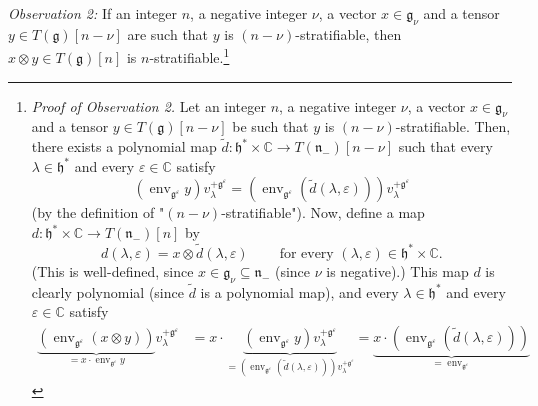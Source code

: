 \documentclass
[numbers=enddot,12pt,final,onecolumn,german,notitlepage]{scrartcl}%
\theoremstyle{definition}
\begin{document}
\textit{Observation 2:} If an integer $n$, a negative integer $\nu$, a vector
$x\in\mathfrak{g}_{\nu}$ and a tensor $y\in T\left(  \mathfrak{g}\right)
\left[  n-\nu\right]  $ are such that $y$ is $\left(  n-\nu\right)
$-stratifiable, then $x\otimes y\in T\left(  \mathfrak{g}\right)  \left[
n\right]  $ is $n$-stratifiable.\footnote{\textit{Proof of Observation 2.} Let
an integer $n$, a negative integer $\nu$, a vector $x\in\mathfrak{g}_{\nu}$
and a tensor $y\in T\left(  \mathfrak{g}\right)  \left[  n-\nu\right]  $ be
such that $y$ is $\left(  n-\nu\right)  $-stratifiable. Then, there exists a
polynomial map $\widetilde{d}:\mathfrak{h}^{\ast}\times\mathbb{C}\rightarrow
T\left(  \mathfrak{n}_{-}\right)  \left[  n-\nu\right]  $ such that every
$\lambda\in\mathfrak{h}^{\ast}$ and every $\varepsilon\in\mathbb{C}$ satisfy%
\[
\left(  \operatorname*{env}\nolimits_{\mathfrak{g}^{\varepsilon}}y\right)
v_{\lambda}^{+\mathfrak{g}^{\varepsilon}}=\left(  \operatorname*{env}%
\nolimits_{\mathfrak{g}^{\varepsilon}}\left(  \widetilde{d}\left(
\lambda,\varepsilon\right)  \right)  \right)  v_{\lambda}^{+\mathfrak{g}%
^{\varepsilon}}%
\]
(by the definition of "$\left(  n-\nu\right)  $-stratifiable"). Now, define a
map $d:\mathfrak{h}^{\ast}\times\mathbb{C}\rightarrow T\left(  \mathfrak{n}%
_{-}\right)  \left[  n\right]  $ by
\[
d\left(  \lambda,\varepsilon\right)  =x\otimes\widetilde{d}\left(
\lambda,\varepsilon\right)  \ \ \ \ \ \ \ \ \ \ \text{for every }\left(
\lambda,\varepsilon\right)  \in\mathfrak{h}^{\ast}\times\mathbb{C}.
\]
(This is well-defined, since $x\in\mathfrak{g}_{\nu}\subseteq\mathfrak{n}_{-}$
(since $\nu$ is negative).) This map $d$ is clearly polynomial (since
$\widetilde{d}$ is a polynomial map), and every $\lambda\in\mathfrak{h}^{\ast
}$ and every $\varepsilon\in\mathbb{C}$ satisfy%
\begin{align*}
\underbrace{\left(  \operatorname*{env}\nolimits_{\mathfrak{g}^{\varepsilon}%
}\left(  x\otimes y\right)  \right)  }_{=x\cdot\operatorname*{env}%
\nolimits_{\mathfrak{g}^{\varepsilon}}y}v_{\lambda}^{+\mathfrak{g}%
^{\varepsilon}}  &  =x\cdot\underbrace{\left(  \operatorname*{env}%
\nolimits_{\mathfrak{g}^{\varepsilon}}y\right)  v_{\lambda}^{+\mathfrak{g}%
^{\varepsilon}}}_{=\left(  \operatorname*{env}\nolimits_{\mathfrak{g}%
^{\varepsilon}}\left(  \widetilde{d}\left(  \lambda,\varepsilon\right)
\right)  \right)  v_{\lambda}^{+\mathfrak{g}^{\varepsilon}}}%
=\underbrace{x\cdot\left(  \operatorname*{env}\nolimits_{\mathfrak{g}%
^{\varepsilon}}\left(  \widetilde{d}\left(  \lambda,\varepsilon\right)
\right)  \right)  }_{=\operatorname*{env}\nolimits_{\mathfrak{g}^{\varepsilon
}}}
\end{align*}}
\end{document}
